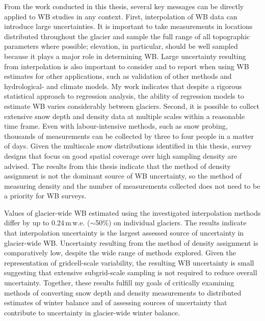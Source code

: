 \documentclass{sfuthesis}
\begin{document}
{From the work conducted in this thesis, several key messages can be directly applied to WB studies in any context. First, interpolation of WB data can introduce large uncertainties. It is important to take measurements in locations distributed throughout the glacier and sample the full range of all topographic parameters where possible; elevation, in particular, should be well sampled because it plays a major role in determining WB. Large uncertainty resulting from interpolation is also important to consider and to report when using WB estimates for other applications, such as validation of other methods and hydrological- and climate models. My work indicates that despite a rigorous statistical approach to regression analysis, the ability of regression models to estimate WB varies considerably between glaciers. Second, it is possible to collect extensive snow depth and density data at multiple scales within a reasonable time frame. Even with labour-intensive methods, such as snow probing, thousands of measurements can be collected by three to four people in a matter of days. Given the multiscale snow distributions identified in this thesis, survey designs that focus on good spatial coverage over high sampling density are advised. The results from this thesis indicate that the method of density assignment is not the dominant source of WB uncertainty, so the method of measuring density and the number of measurements collected does not need to be a priority for WB surveys.  

Values of glacier-wide WB estimated using the investigated interpolation methods differ by up to 0.24\,m\,w.e. ($\sim$50\%) on individual glaciers. The results indicate that interpolation uncertainty is the largest assessed source of uncertainty in glacier-wide WB. Uncertainty resulting from the method of density assignment is comparatively low, despite the wide range of methods explored. Given the representation of gridcell-scale variability, the resulting WB uncertainty is small suggesting that extensive subgrid-scale sampling is not required to reduce overall uncertainty. Together, these results fulfill my goals of critically examining methods of converting snow depth and density measurements to distributed estimates of winter balance and of assessing sources of uncertainty that contribute to uncertainty in glacier-wide winter balance. 

%
%
%
%
%

}
\end{document}
